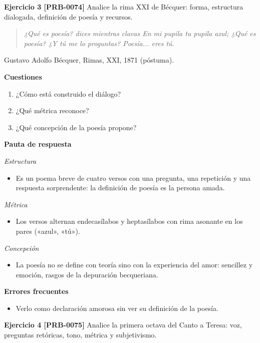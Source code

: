 \documentclass{book}
\begin{document}
\noindent\textbf{Ejercicio 3 [PRB-0074]}
Analice la rima XXI de Bécquer: forma, estructura dialogada, definición de poesía y recursos.


\begin{quote}
\itshape ¿Qué es poesía? dices mientras clavas En mi pupila tu pupila azul; ¿Qué es poesía? ¿Y tú me lo proguntas? Poesía... eres tú.
\end{quote}
{\noindent\footnotesize Gustavo Adolfo Bécquer, Rimas, XXI, 1871 (póstuma).\par}

\noindent\textbf{Cuestiones}
\begin{enumerate}
\item ¿Cómo está construido el diálogo?
\item ¿Qué métrica reconoce?
\item ¿Qué concepción de la poesía propone?
\end{enumerate}

\noindent\textbf{Pauta de respuesta}

\noindent\textit{Estructura}
\begin{itemize}
\item Es un poema breve de cuatro versos con una pregunta, una repetición y una respuesta sorprendente: la definición de poesía es la persona amada.
\end{itemize}

\noindent\textit{Métrica}
\begin{itemize}
\item Los versos alternan endecasílabos y heptasílabos con rima asonante en los pares («azul», «tú»).
\end{itemize}

\noindent\textit{Concepción}
\begin{itemize}
\item La poesía no se define con teoría sino con la experiencia del amor: sencillez y emoción, rasgos de la depuración becqueriana.
\end{itemize}

\noindent\textbf{Errores frecuentes}
\begin{itemize}
\item Verlo como declaración amorosa sin ver su definición de la poesía.
\end{itemize}

\noindent\textbf{Ejercicio 4 [PRB-0075]}
Analice la primera octava del Canto a Teresa: voz, preguntas retóricas, tono, métrica y subjetivismo.
\end{document}
